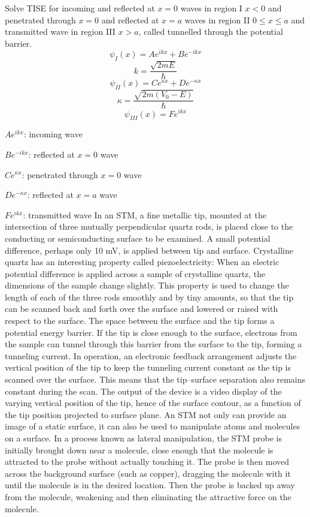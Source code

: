 \documentclass[a4paper,12pt]{article}
\begin{document}
Solve TISE for incoming and reflected at $x=0$ waves in region I $x<0$ and penetrated through $x=0$ and reflected at $x=a$ waves in region II $0\le x\le a$ and transmitted wave in region III $x>a$, called tunnelled through the potential barrier.
\[\psi_I(x)=Ae^{ikx}+Be^{-ikx}\]
\[k=\frac{\sqrt{2mE}}{\hbar}\]
\[\psi_{II}(x)=Ce^{\kappa x}+De^{-\kappa x}\]
\[\kappa=\frac{\sqrt{2m(V_0-E)}}{\hbar}\]
\[\psi_{III}(x)=Fe^{ikx}\]
\bit
\item $Ae^{ikx}$: incoming wave
\item $Be^{-ikx}$: reflected at $x=0$ wave
\item $Ce^{\kappa x}$: penetrated through $x=0$ wave
\item $De^{-\kappa x}$: reflected at $x=a$ wave
\item $Fe^{ikx}$: transmitted wave
\eit
{}
In an STM, a fine metallic tip, mounted at the intersection of three mutually perpendicular quartz rods, is placed close to the conducting or semiconducting surface to be examined. A small potential difference, perhaps only 10 mV, is applied between tip and surface. Crystalline quartz has an interesting property called piezoelectricity: When an electric potential difference is applied across a sample of crystalline quartz, the dimensions of the sample change slightly. This property is used to change the length of each of the three rods smoothly and by tiny amounts, so that the tip can be scanned back and forth over the surface and lowered or raised with respect to the surface. The space between the surface and the tip forms a potential energy barrier. If the tip is close enough to the surface, electrons from the sample can tunnel through this barrier from the surface to the tip, forming a tunneling current. In operation, an electronic feedback arrangement adjusts the vertical position of the tip to keep the tunneling current constant as the tip is scanned over the surface. This means that the tip–surface separation also remains constant during the scan. The output of the device is a video display of the varying vertical position of the tip, hence of the surface contour, as a function of the tip position projected to surface plane. An STM not only can provide an image of a static surface, it can also be used to manipulate atoms and molecules on a surface. In a process known as lateral manipulation, the STM probe is initially brought down near a molecule, close enough that the molecule is attracted to the probe without actually  touching it. The probe is then moved across the background surface (such as copper), dragging the molecule with it until the molecule is in the desired location. Then the probe is backed up away from the molecule, weakening and then eliminating the attractive force on the molecule.
\end{document}
